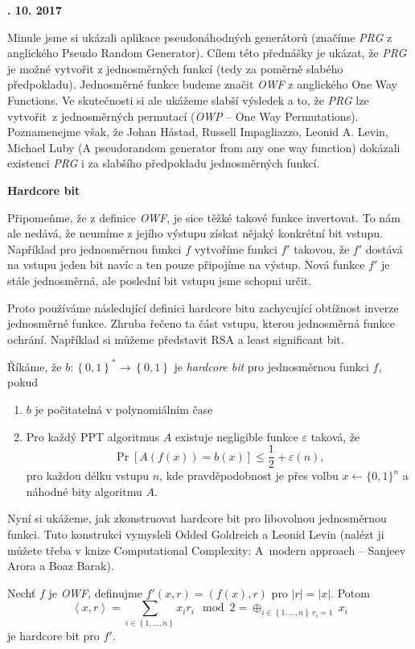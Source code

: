 \documentclass[a4paper,12pt,titlepage]{article}
\def\podnadpis#1{{\bigskip\bf\noindent#1\medskip\par}}
\def\definice{\noindent {\bf Definice: }}
\def\tvrzeni{\noindent {\bf Tvrzení: }}
\renewcommand\epsilon\varepsilon
\begin{document}
\podnadpis{25. 10. 2017}

Minule jsme si ukázali aplikace pseudonáhodných generátorů (značíme \emph{PRG} z anglického Pseudo Random Generator).
Cílem této přednášky je ukázat, že \emph{PRG} je možné vytvořit z jednosměrných funkcí (tedy za poměrně slabého předpokladu).
Jednosměrné funkce budeme značit \emph{OWF} z anglického One Way Functions.
Ve skutečnosti si ale ukážeme slabší výsledek a to, že \emph{PRG} lze vytvořit~z jednosměrných permutací (\emph{OWP} -- One Way Permutations).
Poznamenejme však, že Johan Håstad,	Russell Impagliazzo,	Leonid A. Levin, Michael Luby (A pseudorandom generator from any one way function) dokázali existenci \emph{PRG} i za slabšího předpokladu jednosměrných funkcí.

\podnadpis{Hardcore bit}

Připomeňme, že z definice \emph{OWF}, je sice těžké takové funkce invertovat.
To nám ale nedává, že neumíme z jejího výstupu získat nějaký konkrétní bit vstupu.
Například pro jednosměrnou funkci $f$ vytvoříme funkci $f'$ takovou, že $f'$ dostává na vstupu jeden bit navíc a ten pouze připojíme na výstup.
Nová funkce $f'$ je stále jednosměrná, ale poslední bit vstupu jsme schopni určit.

Proto používáme následující definici hardcore bitu zachycující obtížnost inverze jednosměrné funkce.
Zhruba řečeno ta část vstupu, kterou jednosměrná funkce ochrání.
Například si můžeme představit RSA a least significant bit.

\definice Říkáme, že $b\colon \left\{ 0,1 \right\}^* \rightarrow \left\{ 0,1 \right\}$ je \emph{hardcore bit} pro jednosměrnou funkci $f$, pokud
\begin{enumerate}
	\item $b$ je počitatelná v polynomiálním čase
	\item  Pro každý PPT algoritmus $A$ existuje negligible funkce $\epsilon$ taková, že
		$$
		\Pr[A(f(x)) = b(x)] \leq \frac{1}{2}+\epsilon (n),
		$$
		pro každou délku vstupu $n$, kde pravděpodobnost je přes volbu $x \leftarrow \{0,1\}^n$ a náhodné bity algoritmu $A$.
\end{enumerate}

Nyní si ukážeme, jak zkonstruovat hardcore bit pro libovolnou jednosměrnou funkci.
Tuto konstrukci vymysleli Odded Goldreich a Leonid Levin (nalézt ji můžete třeba v knize Computational Complexity: A~modern approach -- Sanjeev Arora a Boaz Barak).

\tvrzeni Nechť $f$ je \emph{OWF}, definujme $f'(x,r) = (f(x),r)$ pro $|r|=|x|$.
Potom 
$$
\left<x,r\right> = \sum_{i\in \left\{ 1,\ldots , n \right\}} x_ir_i \mod 2 = \oplus_{i\in \left\{ 1, \ldots , n \right\}\ r_i=1}\ x_i
$$ 
je hardcore bit pro $f'$. 
\end{document}

